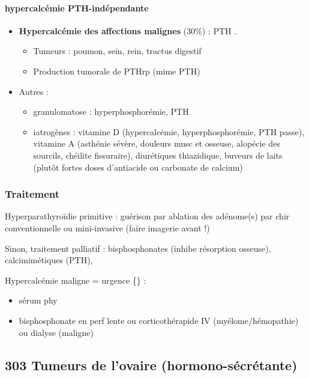 \documentclass[11pt]{article}
\begin{document}
\paragraph{hypercalcémie PTH-indépendante}
\label{sec:org86ed114}
\begin{itemize}
\item \textbf{Hypercalcémie des affections malignes} (30\%) : PTH \dec\dec{}. 
\begin{itemize}
\item Tumeurs : poumon, sein, rein, tractus digestif
\item Production tumorale de PTHrp (mime PTH)
\end{itemize}
\item Autres : 
\begin{itemize}
\item granulomatose : hyperphosphorémie, PTH \dec
\item iatrogènes : vitamine D (hypercalcémie, hyperphosphorémie, PTH passe),
vitamine A (asthénie sévère, douleurs musc et osseuse, alopécie des
sourcils, chéilite fissuraire), diurétiques thiazidique, buveurs de laits
(plutôt fortes doses d'antiacide ou carbonate de calcium)
\end{itemize}
\end{itemize}

\subsubsection{Traitement}
\label{sec:org287d216}
Hyperparathyroïdie primitive : guérison par ablation des adénome(s) par chir
conventionnelle ou mini-invasive (faire imagerie avant !)

Sinon, traitement palliatif : bisphosphonates (inhibe résorption osseuse),
calcimimétiques (\dec PTH), 

\danger Hypercalcémie maligne = urgence \{\} : 
\begin{itemize}
\item sérum phy
\item bisphosphonate en perf lente ou corticothérapide IV (myélome/hémopathie) ou dialyse (maligne)
\end{itemize}
\subsection{303 \textdagger{} Tumeurs de l'ovaire (hormono-sécrétante)}
\label{sec:org28b5773}
\end{document}
